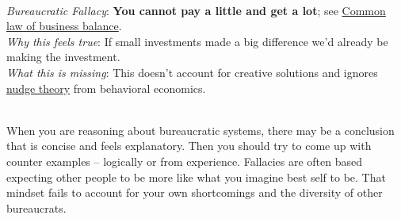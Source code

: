 



\ \\
\textit{Bureaucratic Fallacy}: 
\textbf{You cannot pay a little and get a lot}; see \href{https://en.wikipedia.org/wiki/Common_law_of_business_balance}{Common law of business balance}. 
 \\
\textit{Why this feels true}: If small investments made a big difference we'd already be making the investment.\\
\textit{What this is missing}: This doesn't account for creative solutions and ignores \href{https://en.wikipedia.org/wiki/Nudge_theory}{nudge theory} from behavioral economics. 

\ \\

When you are reasoning about bureaucratic systems, there may be a conclusion that is concise and feels explanatory. Then you should try to come up with counter examples -- logically or from experience.  Fallacies are often based expecting other people to be more like what you imagine best self to be. That mindset fails to account for your own shortcomings and the diversity of other bureaucrats. 

